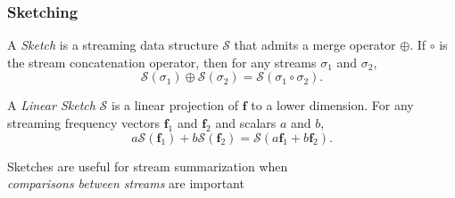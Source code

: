 \documentclass{beamer}
\begin{document}
\begin{frame}
\frametitle{Sketching}

\begin{definition}[Sketch]
A \emph{Sketch} is a streaming data structure $\mathcal{S}$ that admits a merge operator $\oplus$. 
If $\circ$ is the stream concatenation operator, then for any streams $\sigma_1$ and $\sigma_2$,
\begin{equation*}
	\mathcal{S}(\sigma_1) \oplus \mathcal{S}(\sigma_2) = \mathcal{S}(\sigma_1 \circ \sigma_2).
\end{equation*}
\end{definition}

\begin{definition}
A \emph{Linear Sketch} $\mathcal{S}$ is a linear projection of $\mathbf{f}$ to a lower dimension.
For any streaming frequency vectors $\mathbf{f}_1$ and $\mathbf{f}_2$ and scalars $a$ and $b$, 
\begin{equation*}
	a\mathcal{S}(\mathbf{f}_1) + b\mathcal{S}(\mathbf{f}_2) = \mathcal{S}(a\mathbf{f}_1 + b\mathbf{f}_2).
\end{equation*}
\end{definition}

\begin{block}{}
\begin{center}
	Sketches are useful for stream summarization when \\
	\emph{comparisons between streams} are important
\end{center}
\end{block}

\end{frame}

\end{document}
